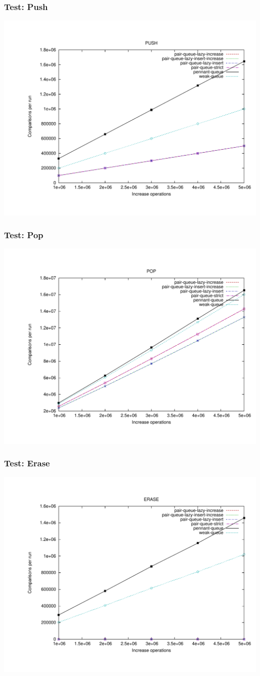 \documentclass{beamer}
\begin{document}
\begin{frame}
\frametitle{Test: Push}
\includegraphics[width=.85\textwidth]{../graphs/push.pdf}
\end{frame}
\begin{frame}
\frametitle{Test: Pop}
\includegraphics[width=.85\textwidth]{../graphs/pop.pdf}
\end{frame}
\begin{frame}
\frametitle{Test: Erase}
\includegraphics[width=.85\textwidth]{../graphs/erase.pdf}
\end{frame}
\end{document}
